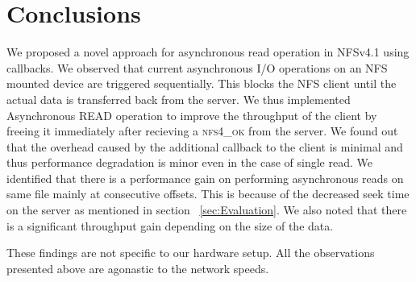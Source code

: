 \section{Conclusions}
\label{conc}
We proposed a novel approach for asynchronous read operation in NFSv4.1 using callbacks. We observed that current asynchronous I/O operations on an NFS mounted device are triggered sequentially. This blocks the NFS client until the actual data is transferred back from the server. We thus implemented Asynchronous READ operation to improve the throughput of the client by freeing it immediately after recieving a \textsc{nfs4\_ok} from the server. We found out that the overhead caused by the additional callback to the client is minimal and thus performance degradation is minor even in the case of single read. We identified that there is a performance gain on performing asynchronous reads on same file mainly at consecutive offsets. This is because of the decreased seek time on the server as mentioned in section ~\ref{sec:Evaluation}. We also noted that there is a significant throughput gain depending on the size of the data.  

These findings are not specific to our hardware setup. All the observations presented above are agonastic to the network speeds.    

